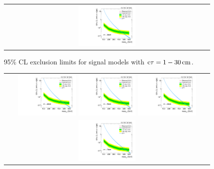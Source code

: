 \begin{figure}[!h]
\begin{tabular}{c}
    \includegraphics[width=0.29\textwidth]{figures/analysis/Interpretation/ExclusionLimits/LimitPlot_ctau30cm.pdf} \\
  \end{tabular}
  \caption{95\% CL exclusion limits for signal models with $\text{c}\tau = 1-30\,\text{cm}$.}
  \label{fig:1dLimitsA}
\end{figure}

\begin{figure}[!h]
  \centering 
  \begin{tabular}{c}
    \includegraphics[width=0.29\textwidth]{figures/analysis/Interpretation/ExclusionLimits/LimitPlot_ctau40cm.pdf} 
    \includegraphics[width=0.29\textwidth]{figures/analysis/Interpretation/ExclusionLimits/LimitPlot_ctau50cm.pdf} 
    \includegraphics[width=0.29\textwidth]{figures/analysis/Interpretation/ExclusionLimits/LimitPlot_ctau60cm.pdf} \\
    \includegraphics[width=0.29\textwidth]{figures/analysis/Interpretation/ExclusionLimits/LimitPlot_ctau70cm.pdf} 

\end{tabular}
\end{figure}
